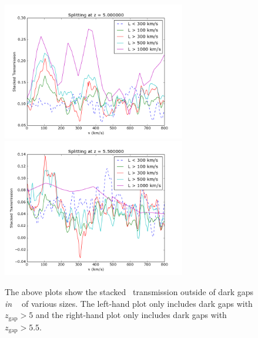 \documentclass[11pt]{article}
\begin{document}
\begin{figure}[h]
  \centering
  \includegraphics[width=8cm]{LybStack_zGreaterThan5.png}
  \includegraphics[width=8cm]{LybStack_zGreaterThan5p5.png}
  \caption{The above plots show the stacked \lya\ transmission outside of dark gaps \textit{in \lyb\ } of various sizes. The left-hand plot only includes dark gaps with $z_{\text{gap}} > 5$ and the right-hand plot only includes dark gaps with $z_{\text{gap}} > 5.5$.}
  \label{fig:todo}
\end{figure}
\end{document}
